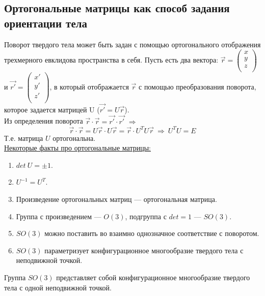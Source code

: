 \subsection{Ортогональные матрицы как способ задания ориентации тела}
Поворот твердого тела может быть задан с помощью ортогонального отображения трехмерного евклидова пространства в себя. Пусть есть два вектора: $\vec{r}=\begin{pmatrix}x\\y\\z\\ \end{pmatrix}$ и $\vec{r'}=\begin{pmatrix}x'\\y'\\z'\\ \end{pmatrix}$, в который отображается $\vec{r}$ с помощью преобразования поворота, которое задается матрицей U ($\vec{r'} = U\vec{r}$).\\
Из определения поворота $\vec{r}\cdot\vec{r} = \vec{r'}\cdot\vec{r'}$ $\Longrightarrow$
\[
\vec{r}\cdot\vec{r} = U\vec{r} \cdot U\vec{r} = \vec{r} \cdot U^TU\vec{r} \ \Longrightarrow \ U^TU = E
\]
Т.е. матрица $U$ ортогональна.\\
\underline{Некоторые факты про ортогональные матрицы:}\\
\begin{enumerate}
    \item $det~U = \pm 1$.
    \item $U^{-1} = U^T$.
    \item Произведение ортогональных матриц --- ортогональная матрица.
    \item Группа с произведением --- $O(3)$, подгруппа с $det = 1$ --- $SO(3)$.
    \item $SO(3)$ можно поставить во взаимно однозначное соответствие с поворотом.
    \item $SO(3)$ параметризует конфигурационное многообразие твердого тела с неподвижной точкой.
\end{enumerate}
Группа $SO(3)$ представляет собой конфигурационное многообразие твердого тела с одной неподвижной точкой.\\

